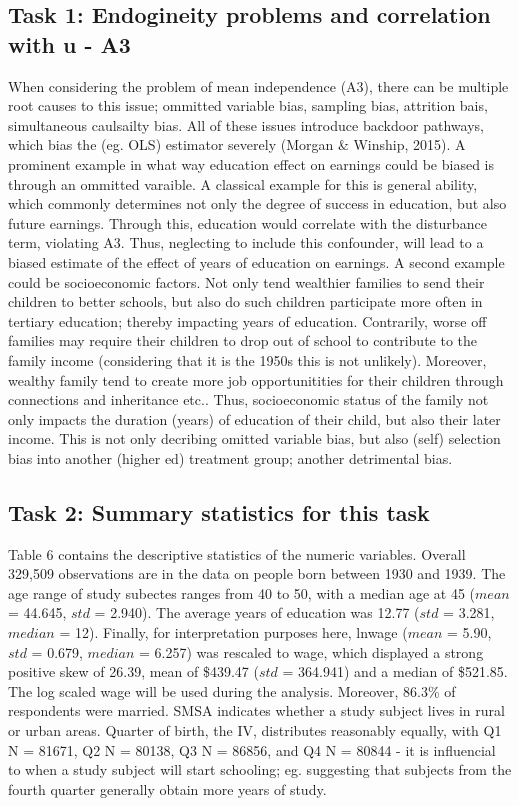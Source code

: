 \documentclass[a4paper]{article}
\begin{document}
\subsection{Task 1: Endogineity problems and correlation with u - A3}
When considering the problem of mean independence (A3), there can be multiple root causes to this issue; ommitted variable bias, sampling bias, attrition bais, simultaneous caulsailty bias. All of these issues introduce backdoor pathways, which bias the (eg. OLS) estimator severely (Morgan \& Winship, 2015). 
A prominent example in what way education effect on earnings could be biased is through an ommitted varaible. A classical example for this is general ability, which commonly determines not only the degree of success in education, but also future earnings. Through this, education would correlate with the disturbance term, violating A3. Thus, neglecting to include this confounder, will lead to a biased estimate of the effect of years of education on earnings.
A second example could be socioeconomic factors. Not only tend wealthier families to send their children to better schools, but also do such children participate more often in tertiary education; thereby impacting years of education. Contrarily, worse off families may require their children to drop out of school to contribute to the family income (considering that it is the 1950s this is not unlikely). Moreover, wealthy family tend to create more job opportunitities for their children through connections and inheritance etc.. Thus, socioeconomic status of the family not only impacts the duration (years) of education of their child, but also their later income. This is not only decribing omitted variable bias, but also (self) selection bias into another (higher ed) treatment group; another detrimental bias.

\subsection{Task 2: Summary statistics for this task}

Table 6 contains the descriptive statistics of the numeric variables. Overall 329,509 observations are in the data on people born between 1930 and 1939. The age range of study subectes ranges from 40 to 50, with a median age at 45 ($mean$ = 44.645, $std$ = 2.940). The average years of education was 12.77 ($std$ = 3.281, $median$ = 12). Finally, for interpretation purposes here, lnwage ($mean$ = 5.90, $std$ = 0.679, $median$ = 6.257) was rescaled to wage, which displayed a strong positive skew of 26.39, mean of \$439.47 ($std$ = 364.941) and a median of \$521.85. The log scaled wage will be used during the analysis. 
Moreover, 86.3\% of respondents were married. SMSA indicates whether a study subject lives in rural or urban areas. Quarter of birth, the IV, distributes reasonably equally, with Q1 N = 81671, Q2 N = 80138, Q3 N = 86856, and Q4 N = 80844 - it is influencial to when a study subject will start schooling; eg. suggesting that subjects from the fourth quarter generally obtain more years of study.  
\end{document}
